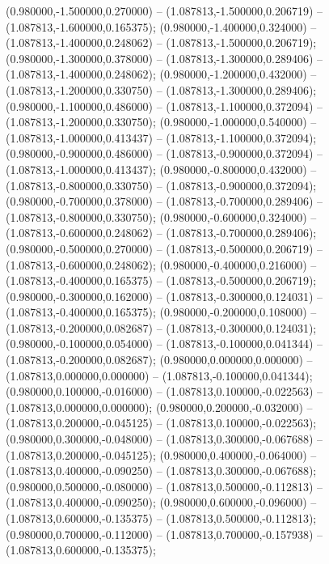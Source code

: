  (0.980000,-1.500000,0.270000) -- (1.087813,-1.500000,0.206719) -- (1.087813,-1.600000,0.165375);
 (0.980000,-1.400000,0.324000) -- (1.087813,-1.400000,0.248062) -- (1.087813,-1.500000,0.206719);
 (0.980000,-1.300000,0.378000) -- (1.087813,-1.300000,0.289406) -- (1.087813,-1.400000,0.248062);
 (0.980000,-1.200000,0.432000) -- (1.087813,-1.200000,0.330750) -- (1.087813,-1.300000,0.289406);
 (0.980000,-1.100000,0.486000) -- (1.087813,-1.100000,0.372094) -- (1.087813,-1.200000,0.330750);
 (0.980000,-1.000000,0.540000) -- (1.087813,-1.000000,0.413437) -- (1.087813,-1.100000,0.372094);
 (0.980000,-0.900000,0.486000) -- (1.087813,-0.900000,0.372094) -- (1.087813,-1.000000,0.413437);
 (0.980000,-0.800000,0.432000) -- (1.087813,-0.800000,0.330750) -- (1.087813,-0.900000,0.372094);
 (0.980000,-0.700000,0.378000) -- (1.087813,-0.700000,0.289406) -- (1.087813,-0.800000,0.330750);
 (0.980000,-0.600000,0.324000) -- (1.087813,-0.600000,0.248062) -- (1.087813,-0.700000,0.289406);
 (0.980000,-0.500000,0.270000) -- (1.087813,-0.500000,0.206719) -- (1.087813,-0.600000,0.248062);
 (0.980000,-0.400000,0.216000) -- (1.087813,-0.400000,0.165375) -- (1.087813,-0.500000,0.206719);
 (0.980000,-0.300000,0.162000) -- (1.087813,-0.300000,0.124031) -- (1.087813,-0.400000,0.165375);
 (0.980000,-0.200000,0.108000) -- (1.087813,-0.200000,0.082687) -- (1.087813,-0.300000,0.124031);
 (0.980000,-0.100000,0.054000) -- (1.087813,-0.100000,0.041344) -- (1.087813,-0.200000,0.082687);
 (0.980000,0.000000,0.000000) -- (1.087813,0.000000,0.000000) -- (1.087813,-0.100000,0.041344);
 (0.980000,0.100000,-0.016000) -- (1.087813,0.100000,-0.022563) -- (1.087813,0.000000,0.000000);
 (0.980000,0.200000,-0.032000) -- (1.087813,0.200000,-0.045125) -- (1.087813,0.100000,-0.022563);
 (0.980000,0.300000,-0.048000) -- (1.087813,0.300000,-0.067688) -- (1.087813,0.200000,-0.045125);
 (0.980000,0.400000,-0.064000) -- (1.087813,0.400000,-0.090250) -- (1.087813,0.300000,-0.067688);
 (0.980000,0.500000,-0.080000) -- (1.087813,0.500000,-0.112813) -- (1.087813,0.400000,-0.090250);
 (0.980000,0.600000,-0.096000) -- (1.087813,0.600000,-0.135375) -- (1.087813,0.500000,-0.112813);
 (0.980000,0.700000,-0.112000) -- (1.087813,0.700000,-0.157938) -- (1.087813,0.600000,-0.135375);
